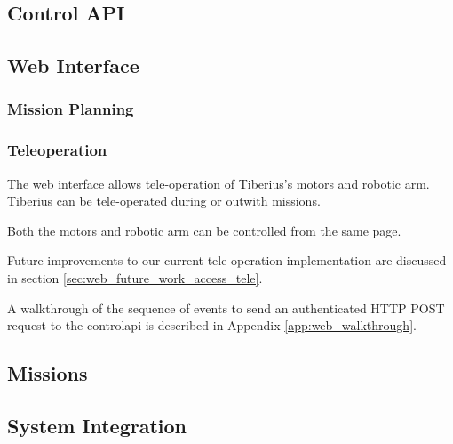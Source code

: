\subsection{Control API}




\subsection{Web Interface}

\subsubsection{Mission Planning}

\subsubsection{Teleoperation}

The web interface allows tele-operation of Tiberius's motors and robotic arm. Tiberius can be tele-operated during or outwith missions.

Both the motors and robotic arm can be controlled from the same page.

Future improvements to our current tele-operation implementation are discussed in section \ref{sec:web_future_work_access_tele}.

A walkthrough of the sequence of events to send an authenticated \gls{HTTP} \gls{POST} request to the \gls{controlapi} is described in Appendix \ref{app:web_walkthrough}.

\subsection{Missions}
\label{sec:web_design_missions}



\subsection{System Integration}